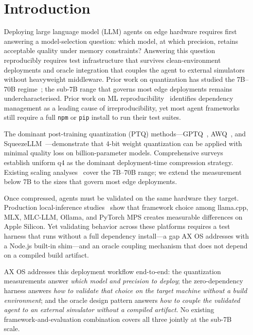 \documentclass[10pt,twocolumn]{article}
\begin{document}
\section{Introduction}
\label{sec:intro}

Deploying large language model (LLM) agents on edge hardware requires first
answering a model-selection question: which model, at which precision, retains
acceptable quality under memory constraints?  Answering this question
reproducibly requires test infrastructure that survives clean-environment
deployments and oracle integration that couples the agent to external simulators
without heavyweight middleware.  Prior work on quantization has studied the 7B--70B
regime~\citep{zhao2025benchmarking,xu2024scaling,ouyang2024lowbit}; the
sub-7B range that governs most edge deployments remains undercharacterised.
Prior work on ML reproducibility~\citep{gundersen2018state,pineau2021improving}
identifies dependency management as a leading cause of
irreproducibility, yet most agent frameworks still require a full \texttt{npm}
or \texttt{pip} install to run their test suites.

The dominant post-training quantization (PTQ) methods---GPTQ~\citep{frantar2023gptq},
AWQ~\citep{lin2023awq}, and SqueezeLLM~\citep{kim2024squeezellm}---demonstrate
that 4-bit weight quantization can be applied with minimal quality loss on
billion-parameter models.  Comprehensive surveys~\citep{wan2024efficient,zhu2024survey}
establish uniform q4 as the dominant deployment-time compression strategy.
Existing scaling analyses~\citep{xu2024scaling,ouyang2024lowbit} cover the
7B--70B range; we extend the measurement below 7B to the sizes that govern most
edge deployments.

Once compressed, agents must be validated on the same hardware they target.
Production local-inference studies~\citep{rajesh2025productiongrade} show that
framework choice among llama.cpp, MLX, MLC-LLM, Ollama, and PyTorch MPS creates
measurable differences on Apple Silicon.  Yet validating behavior across these
platforms requires a test harness that runs without a full dependency install---a
gap AX OS addresses with a Node.js built-in shim---and an oracle coupling
mechanism that does not depend on a compiled build artifact.

AX OS addresses this deployment workflow end-to-end:
the quantization measurements answer \emph{which model and precision to deploy};
the zero-dependency harness answers \emph{how to validate that choice on the
target machine without a build environment}; and the oracle design pattern answers
\emph{how to couple the validated agent to an external simulator without a
compiled artifact}.  No existing framework-and-evaluation combination covers
all three jointly at the sub-7B scale.
\end{document}
